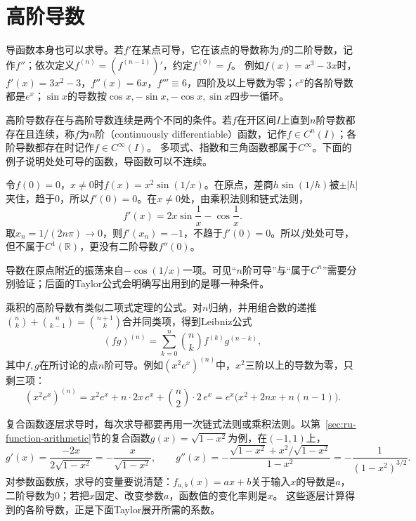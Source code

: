 \section{高阶导数}
\label{sec:ru-higher-derivatives}

导函数本身也可以求导。若$f'$在某点可导，它在该点的导数称为$f$的二阶导数，记作$f''$；依次定义$f^{(n)}=(f^{(n-1)})'$，约定$f^{(0)}=f$。
例如$f(x)=x^3-3x$时，$f'(x)=3x^2-3$，$f''(x)=6x$，$f'''\equiv6$，四阶及以上导数为零；$e^x$的各阶导数都是$e^x$；$\sin x$的导数按$\cos x,-\sin x,-\cos x,\sin x$四步一循环。

高阶导数存在与高阶导数连续是两个不同的条件。若$f$在开区间$I$上直到$n$阶导数都存在且连续，称$f$为$n$阶（continuously differentiable）函数，记作$f\in C^n(I)$；各阶导数都存在时记作$f\in C^\infty(I)$。
多项式、指数和三角函数都属于$C^\infty$。下面的例子说明处处可导的函数，导函数可以不连续。
\begin{example}[处处可导而导函数不连续]
\label{ex:analysis-derivative-not-continuous}
令$f(0)=0$，$x\neq0$时$f(x)=x^2\sin(1/x)$。在原点，差商$h\sin(1/h)$被$\pm|h|$夹住，趋于$0$，所以$f'(0)=0$。在$x\neq0$处，由乘积法则和链式法则，
\[
 f'(x)=2x\sin\frac1x-\cos\frac1x.
\]
取$x_n=1/(2n\pi)\to0$，则$f'(x_n)=-1$，不趋于$f'(0)=0$。所以$f$处处可导，但不属于$C^1(\mathbb R)$，更没有二阶导数$f''(0)$。
\end{example}
导数在原点附近的振荡来自$-\cos(1/x)$一项。可见“$n$阶可导”与“属于$C^n$”需要分别验证；后面的Taylor公式会明确写出用到的是哪一种条件。

乘积的高阶导数有类似二项式定理的公式。对$n$归纳，并用组合数的递推$\binom nk+\binom n{k-1}=\binom{n+1}k$合并同类项，得到Leibniz公式
\[
 (fg)^{(n)}=\sum_{k=0}^n\binom nkf^{(k)}g^{(n-k)},
\]
其中$f,g$在所讨论的点$n$阶可导。例如$(x^2e^x)^{(n)}$中，$x^2$三阶以上的导数为零，只剩三项：
\[
 (x^2e^x)^{(n)}=x^2e^x+n\cdot2x\,e^x+\binom n2\cdot2\,e^x=e^x\bigl(x^2+2nx+n(n-1)\bigr).
\]

复合函数逐层求导时，每次求导都要再用一次链式法则或乘积法则。以第~\ref{sec:ru-function-arithmetic}节的复合函数$g(x)=\sqrt{1-x^2}$为例，在$(-1,1)$上，
\[
 g'(x)=\frac{-2x}{2\sqrt{1-x^2}}=-\frac x{\sqrt{1-x^2}},\qquad
 g''(x)=-\frac{\sqrt{1-x^2}+x^2/\sqrt{1-x^2}}{1-x^2}=-\frac1{(1-x^2)^{3/2}}.
\]
对参数函数族，求导的变量要说清楚：$f_{a,b}(x)=ax+b$关于输入$x$的导数是$a$，二阶导数为$0$；若把$x$固定、改变参数$a$，函数值的变化率则是$x$。
这些逐层计算得到的各阶导数，正是下面Taylor展开所需的系数。
